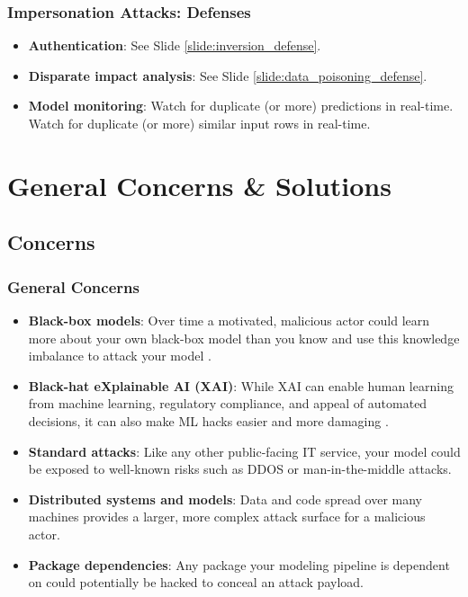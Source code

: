 \documentclass[11pt,
               aspectratio=169,
               hyperref={colorlinks}
               ]{beamer}
\begin{document}
			\begin{frame}
		
				\frametitle{Impersonation Attacks: \textbf{Defenses}}		
			
				\begin{itemize}
					\Large
					\item \textbf{Authentication}: See Slide \ref{slide:inversion_defense}. 
					\item \textbf{Disparate impact analysis}: See Slide \ref{slide:data_poisoning_defense}.
					\item \textbf{Model monitoring}: Watch for duplicate (or more) predictions in real-time. Watch for duplicate (or more) similar input rows in real-time.
				\end{itemize}
				
			\end{frame}

	\section{General Concerns \& Solutions}
		\subsection{Concerns}
			\begin{frame}[t, allowframebreaks]	
		
				\frametitle{General Concerns}	
				\footnotesize
				\begin{itemize}
					\item \textbf{Black-box models}: Over time a motivated, malicious actor could learn more about your own black-box model than you know and use this knowledge imbalance to attack your model \cite{papernot2018marauder}.
					\item \textbf{Black-hat eXplainable AI (XAI)}:  While XAI can enable human learning from machine learning, regulatory compliance, and appeal of automated decisions, it can also make ML hacks easier and more damaging \cite{shokri2019privacy}.
					\item \textbf{Standard attacks}: Like any other public-facing IT service, your model could be exposed to well-known risks such as DDOS or man-in-the-middle attacks.  
					\item \textbf{Distributed systems and models}: Data and code spread over many machines provides a larger, more complex attack surface for a malicious actor.
					\item \textbf{Package dependencies}: Any package your modeling pipeline is dependent on could potentially be hacked to conceal an attack payload.
				\end{itemize}
				\normalsize

			\end{frame}
\end{document}
